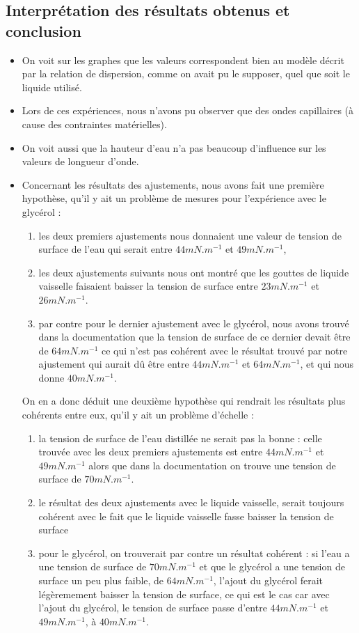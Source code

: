 \documentclass{report}
\begin{document}
\subsection{Interprétation des résultats obtenus et conclusion}
\begin{itemize}[label = ]
    \item On voit sur les graphes que les valeurs correspondent bien au modèle décrit par la relation de dispersion, comme on avait pu le supposer, quel que soit le liquide utilisé.
    \item Lors de ces expériences, nous n'avons pu observer que des ondes capillaires (à cause des contraintes matérielles).
    \item On voit aussi que la hauteur d'eau n'a pas beaucoup d'influence sur les valeurs de longueur d'onde.
    \item Concernant les résultats des ajustements, nous avons fait une première hypothèse, qu'il y ait un problème de mesures pour l'expérience avec le glycérol : 
    \begin{enumerate}
        \item les deux premiers ajustements nous donnaient une valeur de tension de surface de l'eau qui serait entre $44 mN.m^{-1}$ et $49 mN.m^{-1}$,
        \item les deux ajustements suivants nous ont montré que les gouttes de liquide vaisselle faisaient baisser la tension de surface entre $23 mN.m^{-1}$ et $26 mN.m^{-1}$.
        \item par contre pour le dernier ajustement avec le glycérol, nous avons trouvé dans la documentation que la tension de surface de ce dernier devait être de $64mN.m^{-1}$ ce qui n'est pas cohérent avec le résultat trouvé par notre ajustement qui aurait dû être entre $44 mN.m^{-1}$ et $64 mN.m^{-1}$, et qui nous donne $40 mN.m^{-1}$.
     \end{enumerate}
    On en a donc déduit une deuxième hypothèse qui rendrait les résultats plus cohérents entre eux, qu'il y ait un problème d'échelle :
    \begin{enumerate}
        \item la tension de surface de l'eau distillée ne serait pas la bonne : celle trouvée avec les deux premiers ajustements est entre $44 mN.m^{-1}$ et $49 mN.m^{-1}$ alors que dans la documentation on trouve une tension de surface de $70 mN.m^{-1}$.
        \item le résultat des deux ajustements avec le liquide vaisselle, serait toujours cohérent avec le fait que le liquide vaisselle fasse baisser la tension de surface
        \item pour le glycérol, on trouverait par contre un résultat cohérent : si l'eau a une tension de surface de $70 mN.m^{-1}$ et que le glycérol a une tension de surface un peu plus faible, de $64 mN.m^{-1}$, l'ajout du glycérol ferait légèremement baisser la tension de surface, ce qui est le cas car avec l'ajout du glycérol, le tension de surface passe d'entre $44 mN.m^{-1}$ et $49 mN.m^{-1}$, à $40 mN.m^{-1}$.
    \end{enumerate} 
\end{itemize}
\end{document}
